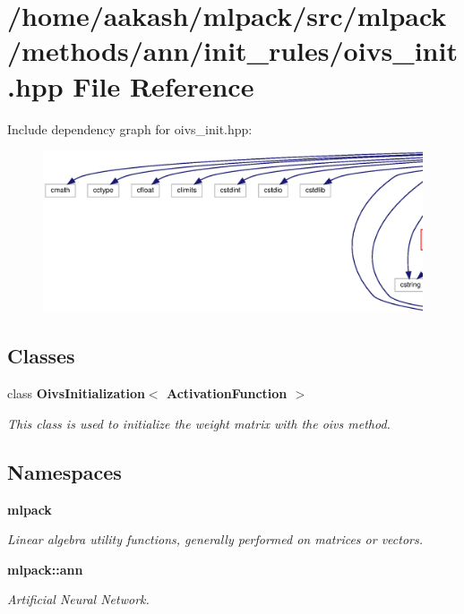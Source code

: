\section{/home/aakash/mlpack/src/mlpack/methods/ann/init\+\_\+rules/oivs\+\_\+init.hpp File Reference}
\label{oivs__init_8hpp}
Include dependency graph for oivs\+\_\+init.\+hpp\+:
\nopagebreak
\begin{figure}[H]
\begin{center}
\leavevmode
\includegraphics[width=350pt]{oivs__init_8hpp__incl}
\end{center}
\end{figure}
\subsection*{Classes}
\begin{DoxyCompactItemize}
\item 
class \textbf{ Oivs\+Initialization$<$ Activation\+Function $>$}
\begin{DoxyCompactList}\small\item\em This class is used to initialize the weight matrix with the oivs method. \end{DoxyCompactList}\end{DoxyCompactItemize}
\subsection*{Namespaces}
\begin{DoxyCompactItemize}
\item 
 \textbf{ mlpack}
\begin{DoxyCompactList}\small\item\em Linear algebra utility functions, generally performed on matrices or vectors. \end{DoxyCompactList}\item 
 \textbf{ mlpack\+::ann}
\begin{DoxyCompactList}\small\item\em Artificial Neural Network. \end{DoxyCompactList}\end{DoxyCompactItemize}


